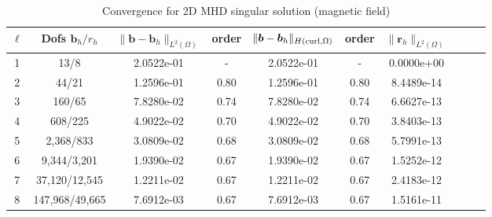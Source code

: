 \documentclass{article}
\newcommand{\uu}[1]{\boldsymbol #1}                     %
\begin{document}
\begin{table}[h!] \small
\begin{center}
\begin{tabular}{cccccccccc}
\hline
$\ell$ &    Dofs $\uu{b}_h/r_h$ & $\|\uu{b}-\uu{b}_h\|_{L^2(\Omega)}$ & order & $\|\uu{b}-\uu{b}_h\|_{H({\rm curl},\Omega)}$ & order &$\|\uu{r}_h\|_{L^2(\Omega)}$ \\
\hline
  1 &     13/8 &  2.0522e-01 &     - &  2.0522e-01 &        - &  0.0000e+00 \\
 2 &     44/21 &  1.2596e-01 &     0.80 &  1.2596e-01 &        0.80 &  8.4489e-14 \\
 3 &    160/65 &  7.8280e-02 &     0.74 &  7.8280e-02 &        0.74 &  6.6627e-13 \\
 4 &    608/225 &  4.9022e-02 &     0.70 &  4.9022e-02 &        0.70 &  3.8403e-13 \\
 5 &   2,368/833 &  3.0809e-02 &     0.68 &  3.0809e-02 &        0.68 &  5.7991e-13 \\
 6 &   9,344/3,201 &  1.9390e-02 &     0.67 &  1.9390e-02 &        0.67 &  1.5252e-12 \\
 7 &  37,120/12,545 &  1.2211e-02 &     0.67 &  1.2211e-02 &        0.67 &  2.4183e-12 \\
 8 &  147,968/49,665 &  7.6912e-03 &     0.67 &  7.6912e-03 &        0.67 &  1.5161e-11 \\
\hline
\end{tabular}
\caption{Convergence for 2D MHD singular solution (magnetic field)}
\label{tab:MHD_2D_smooth_magnetic}
\end{center}
\end{table}
\end{document}
